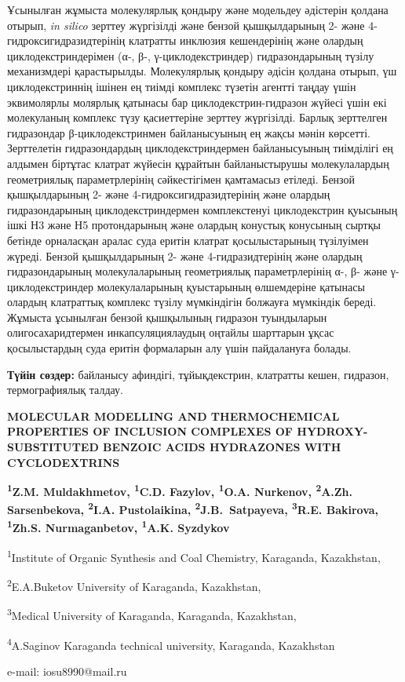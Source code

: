 Ұсынылған жұмыста молекулярлық қондыру және модельдеу әдістерін қолдана
отырып, \emph{in silico} зерттеу жүргізілді және бензой қышқылдарының 2-
және 4-гидроксигидразидтерінің клатратты инклюзия кешендерінің және
олардың циклодекстриндерімен (α-, β-, γ-циклодекстриндер)
гидразондарының түзілу механизмдері қарастырылды. Молекулярлық қондыру
әдісін қолдана отырып, үш циклодекстриннің ішінен ең тиімді комплекс
түзетін агентті таңдау үшін эквимолярлы молярлық қатынасы бар
циклодекстрин-гидразон жүйесі үшін екі молекуланың комплекс түзу
қасиеттеріне зерттеу жүргізілді. Барлық зерттелген гидразондар
β-циклодекстринмен байланысуының ең жақсы мәнін көрсетті. Зерттелетін
гидразондардың циклодекстриндермен байланысуының тиімділігі ең алдымен
біртұтас клатрат жүйесін құрайтын байланыстырушы молекулалардың
геометриялық параметрлерінің сәйкестігімен қамтамасыз етіледі. Бензой
қышқылдарының 2- және 4-гидроксигидразид\-терінің және олардың
гидразондарының циклодекстриндермен комплекстенуі циклодекстрин қуысының
ішкі Н3 және Н5 протондарының және олардың конустық конусының сыртқы
бетінде орналасқан аралас суда еритін клатрат қосылыстарының түзілуімен
жүреді. Бензой қышқылдарының 2- және 4-гидразидтерінің және олардың
гидразондарының молекулаларының геометриялық параметрлерінің α-, β- және
γ-циклодекстриндер молекулаларының қуыстарының өлшемдеріне қатынасы
олардың клатраттық комплекс түзілу мүмкіндігін болжауға мүмкіндік
береді. Жұмыста ұсынылған бензой қышқылының гидразон туындыларын
олигосахаридтермен инкапсуляциялаудың оңтайлы шарттарын ұқсас
қосылыстардың суда еритін формаларын алу үшін пайдалануға болады.

{\bfseries Түйін сөздер:} байланысу афиндігі, тұйықдекстрин, клатратты
кешен, гидразон, термографиялық талдау.

\begin{articleheader}
{\bfseries MOLECULAR MODELLING AND THERMOCHEMICAL PROPERTIES OF INCLUSION COMPLEXES OF HYDROXY-SUBSTITUTED BENZOIC ACIDS HYDRAZONES WITH CYCLODEXTRINS}

{\bfseries
\textsuperscript{1}Z.M. Muldakhmetov,
\textsuperscript{1}C.D. Fazylov\textsuperscript{\envelope },
\textsuperscript{1}O.A. Nurkenov,
\textsuperscript{2}A.Zh. Sarsenbekova,
\textsuperscript{2}I.A. Pustolaikina,
\textsuperscript{2}J.B.~Satpayeva,
\textsuperscript{3}R.E. Bakirova,
\textsuperscript{1}Zh.S. Nurmaganbetov,
\textsuperscript{1}A.K. Syzdykov
}
\end{articleheader}

\begin{affiliation}
\textsuperscript{1}Institute of Organic Synthesis and Coal Chemistry, Karaganda, Kazakhstan,

\textsuperscript{2}E.A.Buketov University of Karaganda, Kazakhstan,

\textsuperscript{3}Medical University of Karaganda, Karaganda, Kazakhstan,

\textsuperscript{4}A.Saginov Karaganda technical university, Karaganda, Kazakhstan

e-mail: iosu8990@mail.ru
\end{affiliation}

